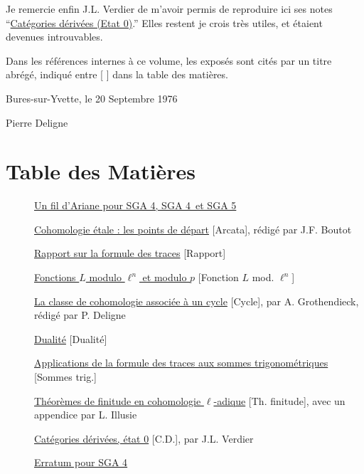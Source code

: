 Je remercie enfin J.L. Verdier de m'avoir permis de reproduire ici ses notes 
``\hyperref[VIII]{Catégories dérivées (Etat 0)}.'' Elles restent je crois très utiles, et 
étaient devenues introuvables. 

Dans les références internes à ce volume, les exposés sont cités par 
un titre abrégé, indiqué entre [ ] dans la table des matières. 

\vspace{20pt}
Bures-sur-Yvette, le 20 Septembre 1976

\vspace{5pt}
Pierre Deligne


\chapter*{Table des Matières}
\label{OriginalContents}
\begin{description}
\item[] \hyperref[Ariane]{Un fil d'Ariane pour SGA 4, SGA 4\textonehalf\ et SGA 5}
\item[] \hyperref[I]{Cohomologie étale : les points de départ} [Arcata], rédigé par J.F. Boutot
\item[] \hyperref[II]{Rapport sur la formule des traces} [Rapport]
\item[] \hyperref[III]{Fonctions $L$ modulo $\ell^n$ et modulo $p$} [Fonction $L$ mod. $\ell^n$]
\item[] \hyperref[IV]{La classe de cohomologie associée à un cycle} [Cycle], par A. Grothendieck, rédigé par P. Deligne
\item[] \hyperref[V]{Dualité} [Dualité]
\item[] \hyperref[VI]{Applications de la formule des traces aux sommes trigonométriques} [Sommes trig.]
\item[] \hyperref[VII]{Théorèmes de finitude en cohomologie $\ell$-adique} [Th. finitude], avec un appendice par L. Illusie
\item[] \hyperref[VIII]{Catégories dérivées, état 0} [C.D.], par J.L. Verdier
\item[] \hyperref[ErratumSGA4]{Erratum pour SGA 4}
\end{description}
\clearpage


